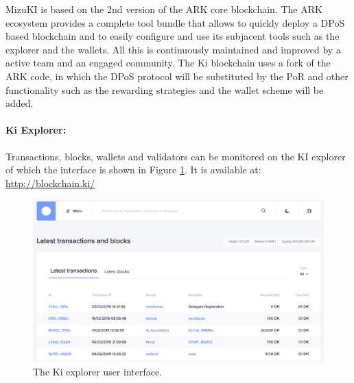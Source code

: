 MizuKI is based on the 2nd version of the ARK core blockchain. The ARK ecosystem provides a complete tool bundle that allows to quickly deploy a DPoS based blockchain and to easily configure and use its subjacent tools such as the explorer and the wallets. All this is continuously maintained and improved by a active team and an engaged community. The Ki blockchain uses a fork of the ARK code, in which the DPoS protocol will be substituted by the PoR and other functionality such as the rewarding strategies and the wallet scheme will be added. 

\paragraph{Ki Explorer:} Transactions, blocks, wallets and validators can be monitored on the KI explorer of which the interface is shown in Figure \ref{fig:explorer}. It is available at: \url{http://blockchain.ki/}

\begin{figure}
	\includegraphics[width=\linewidth, trim= 0cm 0cm 0cm 0cm, clip]{Figures/explorer1}
	\caption{The Ki explorer user interface.}
	\label{fig:explorer}
\end{figure}

